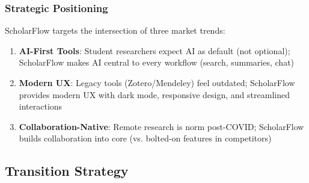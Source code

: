 \subsubsection{Strategic Positioning}

ScholarFlow targets the intersection of three market trends:

\begin{enumerate}
    \item \textbf{AI-First Tools}: Student researchers expect AI as default (not optional); ScholarFlow makes AI central to every workflow (search, summaries, chat)

    \item \textbf{Modern UX}: Legacy tools (Zotero/Mendeley) feel outdated; ScholarFlow provides modern UX with dark mode, responsive design, and streamlined interactions

    \item \textbf{Collaboration-Native}: Remote research is norm post-COVID; ScholarFlow builds collaboration into core (vs. bolted-on features in competitors)
\end{enumerate}

\subsection{Transition Strategy}


